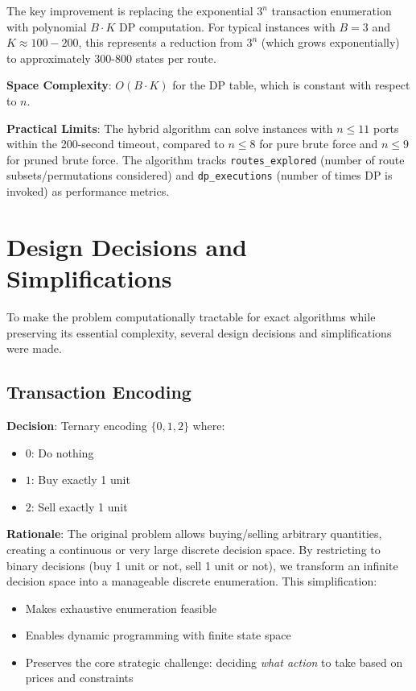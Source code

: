 \documentclass[12pt]{article}
\begin{document}
The key improvement is replacing the exponential $3^n$ transaction enumeration with polynomial $B \cdot K$ DP computation. For typical instances with $B=3$ and $K \approx 100-200$, this represents a reduction from $3^n$ (which grows exponentially) to approximately 300-800 states per route.

\textbf{Space Complexity}: $O(B \cdot K)$ for the DP table, which is constant with respect to $n$.

\textbf{Practical Limits}: The hybrid algorithm can solve instances with $n \leq 11$ ports within the 200-second timeout, compared to $n \leq 8$ for pure brute force and $n \leq 9$ for pruned brute force. The algorithm tracks \texttt{routes\_explored} (number of route subsets/permutations considered) and \texttt{dp\_executions} (number of times DP is invoked) as performance metrics.

\section{Design Decisions and Simplifications}
\label{sec:design_decisions}

To make the problem computationally tractable for exact algorithms while preserving its essential complexity, several design decisions and simplifications were made.

\subsection{Transaction Encoding}
\label{subsec:transaction_encoding}

\textbf{Decision}: Ternary encoding $\{0, 1, 2\}$ where:
\begin{itemize}
    \item $0$: Do nothing
    \item $1$: Buy exactly 1 unit
    \item $2$: Sell exactly 1 unit
\end{itemize}

\textbf{Rationale}: The original problem allows buying/selling arbitrary quantities, creating a continuous or very large discrete decision space. By restricting to binary decisions (buy 1 unit or not, sell 1 unit or not), we transform an infinite decision space into a manageable discrete enumeration. This simplification:
\begin{itemize}
    \item Makes exhaustive enumeration feasible
    \item Enables dynamic programming with finite state space
    \item Preserves the core strategic challenge: deciding \textit{what action} to take based on prices and constraints
\end{itemize}
\end{document}
